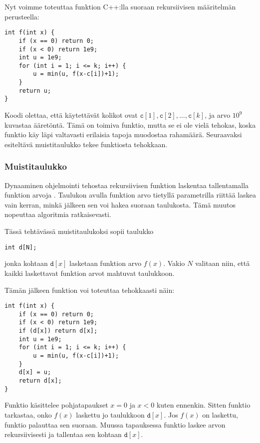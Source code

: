 Nyt voimme toteuttaa funktion C++:lla suoraan
rekursiivisen määritelmän perusteella:

\begin{lstlisting}
int f(int x) {
    if (x == 0) return 0;
    if (x < 0) return 1e9;
    int u = 1e9;
    for (int i = 1; i <= k; i++) {
        u = min(u, f(x-c[i])+1);
    }
    return u;
}
\end{lstlisting}

Koodi olettaa, että käytettävät kolikot ovat
$\texttt{c}[1], \texttt{c}[2], \ldots, \texttt{c}[k]$,
ja arvo $10^9$ kuvastaa ääretöntä.
Tämä on toimiva funktio, mutta se ei ole vielä tehokas,
koska funktio käy läpi valtavasti erilaisia tapoja
muodostaa rahamäärä.
Seuraavaksi esiteltävä muistitaulukko tekee
funktiosta tehokkaan.

\subsubsection{Muistitaulukko}


Dynaaminen ohjelmointi tehostaa
rekursiivisen funktion laskentaa
tallentamalla funktion arvoja .
Taulukon avulla funktion arvo
tietyllä parametrilla riittää laskea
vain kerran, minkä jälkeen sen voi
hakea suoraan taulukosta.
Tämä muutos nopeuttaa algoritmia ratkaisevasti.

Tässä tehtävässä muistitaulukoksi sopii taulukko

\begin{lstlisting}
int d[N];
\end{lstlisting}

jonka kohtaan $\texttt{d}[x]$
lasketaan funktion arvo $f(x)$.
Vakio $N$ valitaan niin, että kaikki
laskettavat funktion arvot mahtuvat taulukkoon.

Tämän jälkeen funktion voi toteuttaa
tehokkaasti näin:

\begin{lstlisting}
int f(int x) {
    if (x == 0) return 0;
    if (x < 0) return 1e9;
    if (d[x]) return d[x];
    int u = 1e9;
    for (int i = 1; i <= k; i++) {
        u = min(u, f(x-c[i])+1);
    }
    d[x] = u;
    return d[x];
}
\end{lstlisting}

Funktio käsittelee pohjatapaukset $x=0$
ja $x<0$ kuten ennenkin.
Sitten funktio tarkastaa,
onko $f(x)$ laskettu jo taulukkoon $\texttt{d}[x]$.
Jos $f(x)$ on laskettu,
funktio palauttaa sen suoraan.
Muussa tapauksessa funktio laskee arvon rekursiivisesti
ja tallentaa sen kohtaan $\texttt{d}[x]$.

